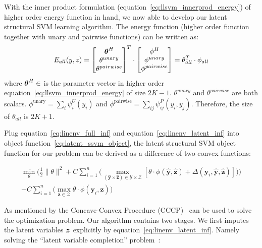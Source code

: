 With the inner product formulation
(equation~\eqref{eq:llsvm_innerprod_energy}) of higher order
energy function in hand, we now able to develop our latent
structural SVM learning algorithm. The energy function (higher
order function together with unary and pairwise functions) can be
written as:
\begin{equation}
  E_{all}(y,z) = \begin{bmatrix}
    \boldsymbol{\theta}^H\\
    \theta^{unary}\\
    \theta^{pairwise}
  \end{bmatrix}^T 
  \cdot \begin{bmatrix}
    \phi^H\\
    \phi^{unary}\\
    \phi^{pairwise}
  \end{bmatrix}=\theta_{all}^T\cdot\phi_{all}
\end{equation}
where $\btheta^H\in \real$ is the parameter vector in higher
order equation~\eqref{eq:llsvm_innerprod_energy} of size $2K-1$.
$\theta^{unary}$ and $\theta^{pairwise}$ are both scalars.
$\phi^\textrm{unary} = \sum_i \psi^U_i\!(y_i)$ and
$\phi^\textrm{pairwise} = \sum_{ij} \psi^P_{ij}(y_i, y_j)$.
Therefore, the size of $\theta_{all}$ is $2K+1$.

Plug equation~\eqref{eq:linenv_full_inf} and
equation~\eqref{eq:linenv_latent_inf} into object
function~\eqref{eq:latent_ssvm_object}, the latent structural SVM
object function for our problem can be derived as a difference of
two convex functions:

\begin{align}
\label{eq:lssvm_object}
  \min_\theta\bigg(\frac{1}{2}\|\theta\|^2+
  C\sum_{i=1}^{n}\big(\max_{(\mathbf{\hat{y}} \times
  \mathbf{\hat{z}}) \in \mathcal{Y} \times \mathcal{Z}}
  [\theta\cdot\phi(\mathbf{\hat{y}},\mathbf{\hat{z}}) +
  \Delta(\mathbf{y}_i,\mathbf{\hat{y}},\mathbf{\hat{z}})]\big)\bigg)\\
  -C\sum_{i=1}^{n}\big(\max_{\mathbf{z} \in \mathcal{Z}} \theta \cdot
  \phi(\mathbf{y}_i,\mathbf{z})\big)\nonumber
\end{align}

As mentioned by  the Concave-Convex
Procedure (CCCP)~\cite{yuille2002concave} can be used to solve the
optimization problem. Our algorithm contains two stages. We first
imputes the latent variables ${\boldsymbol{z}}$ explicitly by
equation~\eqref{eq:linenv_latent_inf}. Namely solving the
``latent variable completion'' problem~\cite{yu2009learning}:

